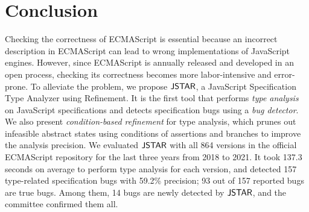 \section{Conclusion}\label{sec:conclusion}
Checking the correctness of ECMAScript is essential because an incorrect description
in ECMAScript can lead to wrong implementations of JavaScript engines. However,
since ECMAScript is annually released and developed in an open process, checking
its correctness becomes more labor-intensive and error-prone.  To alleviate the problem,
we propose $\tool$, a JavaScript Specification Type Analyzer using Refinement.
It is the first tool that performs \textit{type analysis} on JavaScript specifications and
detects specification bugs using a \textit{bug detector}.  We also present
\textit{condition-based refinement} for type analysis, which prunes out infeasible abstract states
using conditions of assertions and branches to improve the analysis precision.
We evaluated $\tool$ with all 864 versions in the official ECMAScript repository
for the last three years from 2018 to 2021.  It took 137.3 seconds on average
to perform type analysis for each version, and detected 157 type-related specification bugs with
59.2\% precision; 93 out of 157 reported bugs are true bugs.
Among them, 14 bugs are newly detected by $\tool$, and the
committee confirmed them all.
